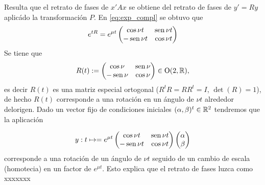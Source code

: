 Resulta que el retrato de fases de $x'Ax$ se obtiene  del retrato de fases de $y'=Ry$ aplicádo la transformación $P$. En \eqref{eq:exp_compl} se obtuvo que
\[
       e^{tR}   =e^{\mu t}
        \begin{pmatrix}
            \cos \nu t& \operatorname{sen} \nu t \\
            -\operatorname{sen} \nu t & \cos \nu t
        \end{pmatrix}
\]
 Se tiene que 
 \[
        R(t):=
        \begin{pmatrix}
            \cos \nu & \operatorname{sen} \nu \\
            -\operatorname{sen} \nu & \cos \nu
        \end{pmatrix}
        \in
        \operatorname{O}(2,\mathbb{R}),
 \]
es decir $R(t)$ es una matriz especial ortogonal ($R^tR=RR^t=I$, $\det(R)=1$),  de hecho $R(t)$ corresponde a una rotación en un ángulo de $\nu t$ alrededor delorigen. Dado un vector fijo de condiciones iniciales $(\alpha,\beta)^t\in\mathbb{R}^2$ tendremos que la aplicación

\[y: t\mapsto  =e^{\mu t}
        \begin{pmatrix}
            \cos \nu t& \operatorname{sen} \nu t \\
            -\operatorname{sen} \nu t & \cos \nu t
        \end{pmatrix}
        \begin{pmatrix}
            \alpha\\
            \beta
        \end{pmatrix}
    \]
corresponde a una rotación de un ángulo de $\nu t$ seguido de un cambio de escala (homotecia) en un factor de $e^{\mu t}$.  Esto explica que el retrato de fases luzca como xxxxxxx

